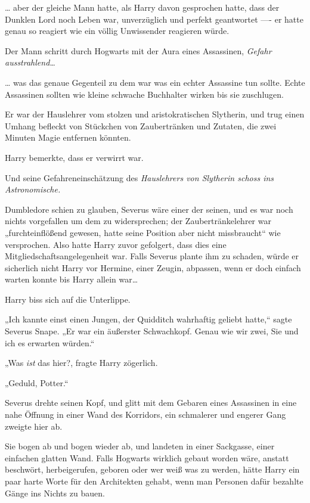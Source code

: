 {… aber der gleiche Mann hatte, als Harry davon gesprochen hatte, dass der Dunklen Lord noch Leben war, unverzüglich und perfekt geantwortet ---- er hatte genau so reagiert wie ein völlig Unwissender reagieren würde.

Der Mann schritt durch Hogwarts mit der Aura eines Assassinen, \emph{Gefahr ausstrahlend…}

… was das genaue Gegenteil zu dem war was ein echter Assassine tun sollte. Echte Assassinen sollten wie kleine schwache Buchhalter wirken bis sie zuschlugen.

Er war der Hauslehrer vom stolzen und aristokratischen Slytherin, und trug einen Umhang befleckt von Stückchen von Zaubertränken und Zutaten, die zwei Minuten Magie entfernen könnten.

Harry bemerkte, dass er verwirrt war.

Und seine Gefahreneinschätzung des \emph{Hauslehrer\emph{s von} \emph{Slytherin} schoss ins Astronomische.}

Dumbledore schien zu glauben, Severus wäre einer der seinen, und es war noch nichts vorgefallen um dem zu widersprechen; der Zaubertränkelehrer war „furchteinflößend gewesen, hatte seine Position aber nicht missbraucht“ wie versprochen. Also hatte Harry zuvor gefolgert, dass dies eine Mitgliedschaftsangelegenheit war. Falls Severus plante ihm zu schaden, würde er sicherlich nicht Harry vor Hermine, einer Zeugin, abpassen, wenn er doch einfach warten konnte bis Harry allein war…

Harry biss sich auf die Unterlippe.

„Ich kannte einst einen Jungen, der Quidditch wahrhaftig geliebt hatte,“ sagte Severus Snape. „Er war ein äußerster Schwachkopf. Genau wie wir zwei, Sie und ich es erwarten würden.“

„Was \emph{ist} das hier?, fragte Harry zögerlich.

„Geduld, Potter.“

Severus drehte seinen Kopf, und glitt mit dem Gebaren eines Assassinen in eine nahe Öffnung in einer Wand des Korridors, ein schmalerer und engerer Gang zweigte hier ab.

Sie bogen ab und bogen wieder ab, und landeten in einer Sackgasse, einer einfachen glatten Wand. Falls Hogwarts wirklich gebaut worden wäre, anstatt beschwört, herbeigerufen, geboren oder wer weiß was zu werden, hätte Harry ein paar harte Worte für den Architekten gehabt, wenn man Personen dafür bezahlte Gänge ins Nichts zu bauen.

}
